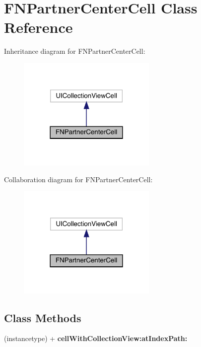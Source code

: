 \hypertarget{interface_f_n_partner_center_cell}{}\section{F\+N\+Partner\+Center\+Cell Class Reference}
\label{interface_f_n_partner_center_cell}


Inheritance diagram for F\+N\+Partner\+Center\+Cell\+:\nopagebreak
\begin{figure}[H]
\begin{center}
\leavevmode
\includegraphics[width=189pt]{interface_f_n_partner_center_cell__inherit__graph}
\end{center}
\end{figure}


Collaboration diagram for F\+N\+Partner\+Center\+Cell\+:\nopagebreak
\begin{figure}[H]
\begin{center}
\leavevmode
\includegraphics[width=189pt]{interface_f_n_partner_center_cell__coll__graph}
\end{center}
\end{figure}
\subsection*{Class Methods}
\begin{DoxyCompactItemize}
\item 
\mbox{\label{interface_f_n_partner_center_cell_a651a6807f6ddf3a01546f86fe888aadf}} 
(instancetype) + {\bfseries cell\+With\+Collection\+View\+:at\+Index\+Path\+:}
\end{DoxyCompactItemize}
